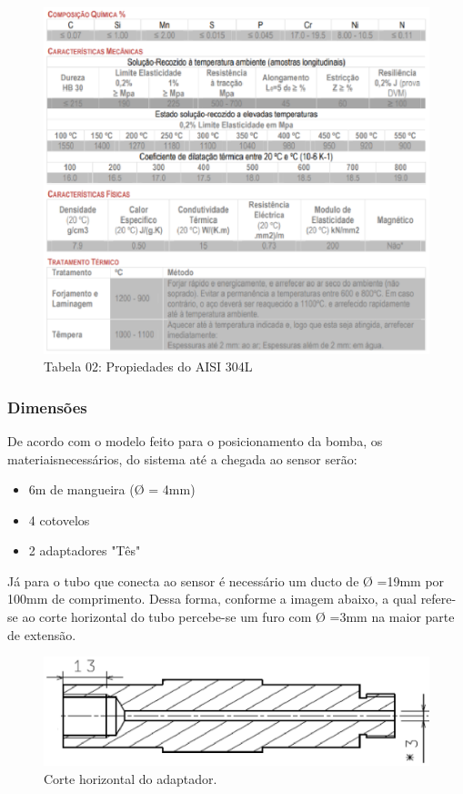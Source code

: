 \begin{figure}[!htb]                                                               
   \centering                                                                      
   \includegraphics[keepaspectratio=true]{figuras/Propriedades.eps}
   \caption{Tabela 02: Propiedades do AISI 304L}                        
\end{figure}

\subsubsection{Dimensões}
De acordo com o modelo feito para o posicionamento da bomba, os materiaisnecessários, do sistema até a chegada ao sensor serão:
\begin{itemize}
\item 6m de mangueira (Ø = 4mm)
\item 4 cotovelos
\item 2 adaptadores "Tês"
\end{itemize}

Já para o tubo que conecta ao sensor é necessário um ducto de Ø =19mm por 100mm de comprimento. Dessa forma, conforme a imagem abaixo, a qual refere-se ao corte horizontal do tubo percebe-se um furo com Ø =3mm na maior parte de extensão.

\begin{figure}[!htb]                                                               
   \centering                                                                      
   \includegraphics[keepaspectratio=true]{figuras/Template.eps}
   \caption{Corte horizontal do adaptador.}                        
\end{figure}


